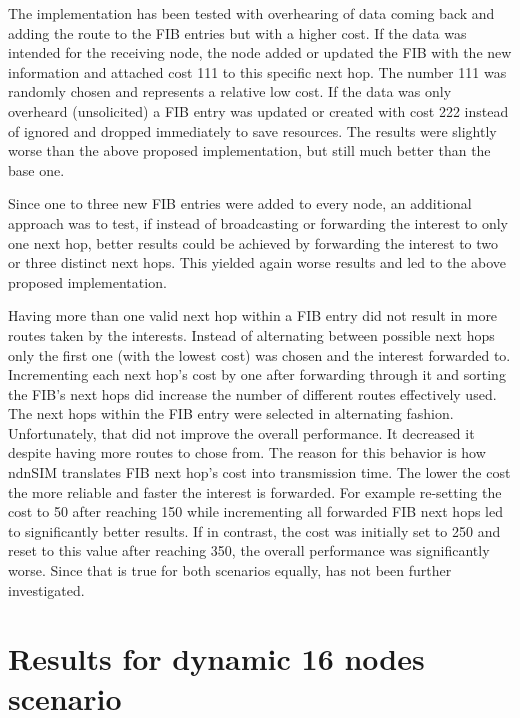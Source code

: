 The implementation has been tested with overhearing of data coming back and adding the route to the FIB entries but with a higher cost. If the data was intended for the receiving node, the node added or updated the FIB with the new information and attached cost 111 to this specific next hop. The number 111 was randomly chosen and represents a relative low cost. If the data was only overheard (unsolicited) a FIB entry was updated or created with cost 222 instead of ignored and dropped immediately to save resources. The results were slightly worse than the above proposed implementation, but still much better than the base one.

\vspace{5mm} %

Since one to three new FIB entries were added to every node, an additional approach was to test, if instead of broadcasting or forwarding the interest to only one next hop, better results could be achieved by forwarding the interest to two or three distinct next hops. This yielded again worse results and led to the above proposed implementation.

\vspace{5mm} %

Having more than one valid next hop within a FIB entry did not result in more routes taken by the interests. Instead of alternating between possible next hops only the first one (with the lowest cost) was chosen and the interest forwarded to. Incrementing each next hop's cost by one after forwarding through it and sorting the FIB's next hops did increase the number of different routes effectively used. The next hops within the FIB entry were selected in alternating fashion. Unfortunately, that did not improve the overall performance. It decreased it despite having more routes to chose from. The reason for this behavior is how ndnSIM translates FIB next hop's cost into transmission time. The lower the cost the more reliable and faster the interest is forwarded. For example re-setting the cost to 50 after reaching 150 while incrementing all forwarded FIB next hops led to significantly better results. If in contrast, the cost was initially set to 250 and reset to this value after reaching 350, the overall performance was significantly worse. Since that is true for both scenarios equally, has not been further investigated.

\section{Results for dynamic 16 nodes scenario}


